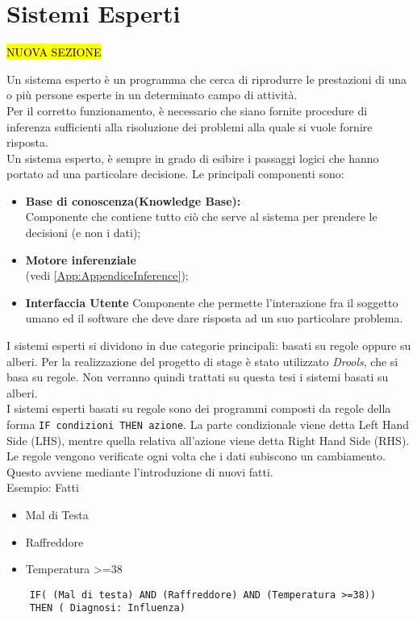 \section{Sistemi Esperti}
\hl{NUOVA SEZIONE}
 \label{App:AppendiceSistemiEsperti}
 
 Un sistema esperto è un programma che cerca di riprodurre le prestazioni di una o più persone esperte in un determinato campo di attività. \\
 Per il corretto funzionamento, è necessario che siano fornite procedure di inferenza sufficienti alla risoluzione dei problemi alla quale si vuole fornire risposta. \\
 Un sistema esperto, è sempre in grado di esibire i passaggi logici che hanno portato ad una particolare decisione.
 Le principali componenti sono: 
 \begin{itemize}
 	\item \textbf{Base di conoscenza(Knowledge Base):}\\
	 	Componente che contiene tutto ciò che serve al sistema per prendere le decisioni (e non i dati); 
	\item \textbf{Motore inferenziale}\\
	  (vedi \autoref{App:AppendiceInference});
	\item \textbf{Interfaccia Utente}
		Componente che permette l'interazione fra il soggetto umano ed il software che deve dare risposta ad un suo particolare problema.
 \end{itemize}
 
 
 I sistemi esperti si dividono in due categorie principali: basati su regole oppure su alberi. 
 Per la realizzazione del progetto di stage è stato utilizzato \textit{Drools}, che si basa su regole. Non verranno quindi trattati su questa tesi i sistemi basati su alberi.\\
 I sistemi esperti basati su regole sono dei programmi composti da regole della forma \texttt{IF condizioni THEN azione}. La parte condizionale viene detta Left Hand Side (LHS), mentre quella relativa all'azione viene detta Right Hand Side (RHS).\\
 Le regole vengono verificate ogni volta che i dati subiscono un cambiamento. Questo avviene mediante l'introduzione di nuovi fatti.\\
 Esempio:
	 Fatti 
	 \begin{itemize}
	 	\item Mal di Testa
	 	\item Raffreddore
	 	\item Temperatura >=38
	 \end{itemize}
 \begin{lstlisting}
	IF( (Mal di testa) AND (Raffreddore) AND (Temperatura >=38))
	THEN ( Diagnosi: Influenza)
 \end{lstlisting}

